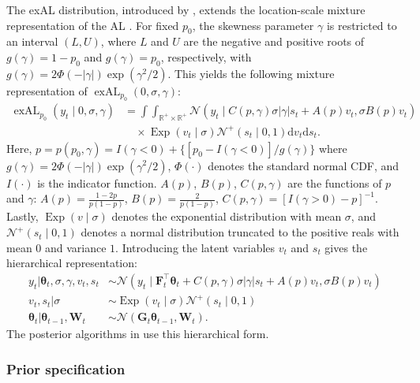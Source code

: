 \documentclass{jss}
\newcommand{\vect}[1]{\boldsymbol{#1}}
\newcommand{\mat}[1]{\mathbf{#1}}
\newcommand{\N}{\mathcal{N}}
\newcommand{\Exp}{\operatorname{Exp}}
\newcommand{\exAL}{\operatorname{exAL}}
\begin{document}
The exAL distribution, introduced by \citet{yan2025family}, extends the location-scale mixture representation of the AL \citep{kozumi2011gibbs}. For fixed $p_0$, the skewness parameter $\gamma$ is restricted to an interval $(L,U)$, where $L$ and $U$ are the negative and positive roots of $g(\gamma) = 1-p_0$ and $g(\gamma) = p_0$, respectively, with $g(\gamma) = 2\Phi(-|\gamma|)\exp(\gamma^2/2)$. This yields the following mixture representation of $\exAL_{p_0}(0,\sigma,\gamma)$:
\begin{equation}
\label{EQ:exALmix}
\begin{aligned}
\exAL_{p_0}(y_t \mid 0,\sigma,\gamma)
&=
\int\int_{\mathbb{R}^+ \times \mathbb{R}^+}
\N(y_t \mid C(p,\gamma) \sigma |\gamma| s_t + A(p) v_t, \sigma B(p) v_t)\\
&\quad \times \Exp(v_t \mid \sigma) \N^+(s_t \mid 0,1) \mathrm{d}v_t \mathrm{d}s_t.
\end{aligned}
\end{equation}
Here, $p = p(p_0,\gamma) = I(\gamma <0) + \{[p_0 - I(\gamma <0)]/g(\gamma) \}$ where $g(\gamma) = 2\Phi(-|\gamma|)\exp(\gamma^2/2)$, $\Phi(\cdot)$ denotes the standard normal CDF, and $I(\cdot)$ is the indicator function. $A(p)$, $B(p)$, $C(p,\gamma)$ are the functions of $p$ and $\gamma$: $A(p) = \frac{1-2p}{p(1-p)}$, $B(p) = \frac{2}{p(1-p)}$, $C(p,\gamma) = [I(\gamma>0) -p]^{-1}$. Lastly, $\Exp(v \mid \sigma)$ denotes the exponential distribution with mean $\sigma$, and $\N^+(s_t \mid 0,1)$ denotes a normal distribution truncated to the positive reals with mean $0$ and variance $1$. Introducing the latent variables $v_t$ and $s_t$ gives the hierarchical representation:
\begin{align}
\label{EQ:exDQLMobs}
y_t | \vect{\theta}_t,\sigma,\gamma,v_t,s_t  & \sim \N(y_t \mid \mat{F}_t^\top \vect{\theta}_t + C(p,\gamma) \sigma |\gamma| s_t + A(p) v_t,\sigma B(p) v_t) \\
v_t, s_t | \sigma & \sim \Exp(v_t \mid \sigma) \N^+(s_t \mid 0,1) \\
\label{EQ:exDQLMevo}
\vect{\theta}_t | \vect{\theta}_{t-1},\mat{W}_t & \sim  \N(\mat{G}_t \vect{\theta}_{t-1},\mat{W}_t).
\end{align}
The posterior algorithms in  use this hierarchical form.


\subsubsection{Prior specification}
\label{sec:priors}
\end{document}
